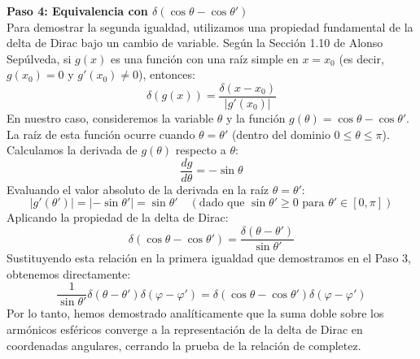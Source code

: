 \documentclass[a4paper]{article}
\begin{document}
\vspace{0.3cm}
\noindent\textbf{Paso 4: Equivalencia con $\delta(\cos\theta - \cos\theta')$} \\
Para demostrar la segunda igualdad, utilizamos una propiedad fundamental de la delta de Dirac bajo un cambio de variable. Según la Sección 1.10 de Alonso Sepúlveda, si $g(x)$ es una función con una raíz simple en $x = x_0$ (es decir, $g(x_0) = 0$ y $g'(x_0) \neq 0$), entonces:
$$
\delta(g(x)) = \frac{\delta(x - x_0)}{|g'(x_0)|}
$$
En nuestro caso, consideremos la variable $\theta$ y la función $g(\theta) = \cos\theta - \cos\theta'$. La raíz de esta función ocurre cuando $\theta = \theta'$ (dentro del dominio $0 \leq \theta \leq \pi$). 
Calculamos la derivada de $g(\theta)$ respecto a $\theta$:
$$
\frac{dg}{d\theta} = -\sin\theta
$$
Evaluando el valor absoluto de la derivada en la raíz $\theta = \theta'$:
$$
|g'(\theta')| = |-\sin\theta'| = \sin\theta' \quad (\text{dado que } \sin\theta' \geq 0 \text{ para } \theta' \in [0, \pi])
$$
Aplicando la propiedad de la delta de Dirac:
$$
\delta(\cos\theta - \cos\theta') = \frac{\delta(\theta - \theta')}{\sin\theta'}
$$
Sustituyendo esta relación en la primera igualdad que demostramos en el Paso 3, obtenemos directamente:
$$
\frac{1}{\sin\theta'} \delta(\theta - \theta') \delta(\varphi - \varphi') = \delta(\cos\theta - \cos\theta') \delta(\varphi - \varphi')
$$
Por lo tanto, hemos demostrado analíticamente que la suma doble sobre los armónicos esféricos converge a la representación de la delta de Dirac en coordenadas angulares, cerrando la prueba de la relación de completez.
\end{document}
